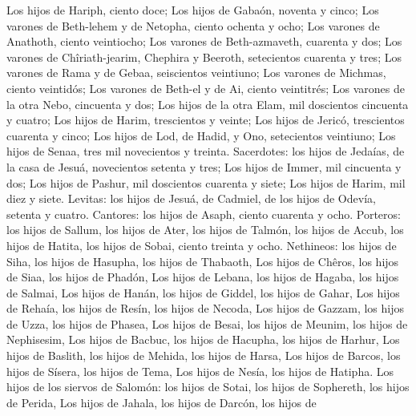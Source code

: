  Los hijos de Hariph, ciento doce;  Los
hijos de Gabaón, noventa y cinco;  Los varones de
Beth-lehem y de Netopha, ciento ochenta y ocho;  Los
varones de Anathoth, ciento veintiocho;  Los varones de
Beth-azmaveth, cuarenta y dos;  Los varones de
Chîriath-jearim, Chephira y Beeroth, setecientos cuarenta y tres;
 Los varones de Rama y de Gebaa, seiscientos veintiuno;
 Los varones de Michmas, ciento veintidós;
 Los varones de Beth-el y de Ai, ciento veintitrés;
 Los varones de la otra Nebo, cincuenta y dos;
 Los hijos de la otra Elam, mil doscientos cincuenta y
cuatro;  Los hijos de Harim, trescientos y veinte;
 Los hijos de Jericó, trescientos cuarenta y cinco;
 Los hijos de Lod, de Hadid, y Ono, setecientos
veintiuno;  Los hijos de Senaa, tres mil novecientos y
treinta.  Sacerdotes: los hijos de Jedaías, de la casa de
Jesuá, novecientos setenta y tres;  Los hijos de Immer,
mil cincuenta y dos;  Los hijos de Pashur, mil doscientos
cuarenta y siete;  Los hijos de Harim, mil diez y siete.
 Levitas: los hijos de Jesuá, de Cadmiel, de los hijos de
Odevía, setenta y cuatro.  Cantores: los hijos de Asaph,
ciento cuarenta y ocho.  Porteros: los hijos de Sallum,
los hijos de Ater, los hijos de Talmón, los hijos de Accub, los hijos de
Hatita, los hijos de Sobai, ciento treinta y ocho. 
Nethineos: los hijos de Siha, los hijos de Hasupha, los hijos de
Thabaoth,  Los hijos de Chêros, los hijos de Siaa, los
hijos de Phadón,  Los hijos de Lebana, los hijos de
Hagaba, los hijos de Salmai,  Los hijos de Hanán, los
hijos de Giddel, los hijos de Gahar,  Los hijos de
Rehaía, los hijos de Resín, los hijos de Necoda,  Los
hijos de Gazzam, los hijos de Uzza, los hijos de Phasea, 
Los hijos de Besai, los hijos de Meunim, los hijos de Nephisesim,
 Los hijos de Bacbuc, los hijos de Hacupha, los hijos de
Harhur,  Los hijos de Baslith, los hijos de Mehida, los
hijos de Harsa,  Los hijos de Barcos, los hijos de
Sísera, los hijos de Tema,  Los hijos de Nesía, los hijos
de Hatipha.  Los hijos de los siervos de Salomón: los
hijos de Sotai, los hijos de Sophereth, los hijos de Perida,
 Los hijos de Jahala, los hijos de Darcón, los hijos de

